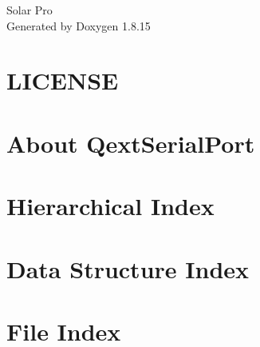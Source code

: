 \let\mypdfximage\pdfximage\def\pdfximage{\immediate\mypdfximage}\documentclass[twoside]{book}
\newcommand{\+}{\discretionary{\mbox{\scriptsize$\hookleftarrow$}}{}{}}
\newcommand{\clearemptydoublepage}{%
  \newpage{\pagestyle{empty}\cleardoublepage}%
}
\begin{document}
\hypersetup{pageanchor=false,
             bookmarksnumbered=true,
             pdfencoding=unicode
            }
\begin{titlepage}
\vspace*{7cm}
\begin{center}%
{\Large Solar Pro }\\
\vspace*{1cm}
{\large Generated by Doxygen 1.8.15}\\
\end{center}
\end{titlepage}
\clearemptydoublepage
{}
\tableofcontents
\clearemptydoublepage
{}
\hypersetup{pageanchor=true}

\chapter{L\+I\+C\+E\+N\+SE}
\label{md___system__volumes__data__users_hannesmachleid_group1_solar__pro__g_u_i_qextserialport__l_i_c_e_n_s_e}

\chapter{About Qext\+Serial\+Port}
\label{md___system__volumes__data__users_hannesmachleid_group1_solar__pro__g_u_i_qextserialport__r_e_a_d_m_e}

\chapter{Hierarchical Index}

\chapter{Data Structure Index}

\chapter{File Index}

\end{document}
